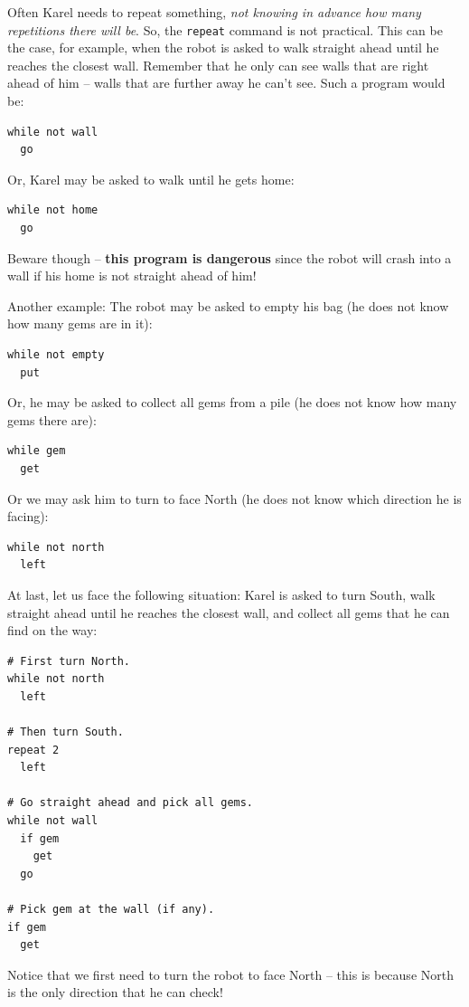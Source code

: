 \documentclass[article,A4,12pt]{llncs}
\begin{document}
{{{{Often Karel needs to repeat something, {\em not knowing in advance how many repetitions
there will be}. So, the {\tt repeat} command is not practical. This can be the case, for example, 
when the robot is asked to walk straight ahead until he reaches the closest wall.
Remember that he only can see walls that are right ahead of him -- walls 
that are further away he can't see. Such a program would be:

\begin{verbatim}
while not wall
  go
\end{verbatim}
Or, Karel may be asked to walk until he gets home:

\begin{verbatim}
while not home
  go
\end{verbatim}
Beware though -- {\bf this program is dangerous} since the robot will crash into a wall
if his home is not straight ahead of him!

Another example: The robot may be asked to empty his bag (he does not know how many gems are in it): 
 
\begin{verbatim}
while not empty
  put
\end{verbatim}
Or, he may be asked to collect all gems from a pile (he does not know 
how many gems there are):

\begin{verbatim}
while gem
  get
\end{verbatim}
Or we may ask him to turn to face North (he does not know which direction he is
facing):

\begin{verbatim}
while not north
  left
\end{verbatim}
At last, let us face the following situation: Karel is asked to 
turn South, walk straight ahead until he reaches the closest wall, and 
collect all gems that he can find on the way:

\begin{verbatim}
# First turn North.
while not north
  left

# Then turn South.
repeat 2
  left

# Go straight ahead and pick all gems.
while not wall
  if gem
    get
  go

# Pick gem at the wall (if any).
if gem
  get
\end{verbatim}
Notice that we first need to turn the robot to face North -- this is because North 
is the only direction that he can check!

}}}}
\end{document}
